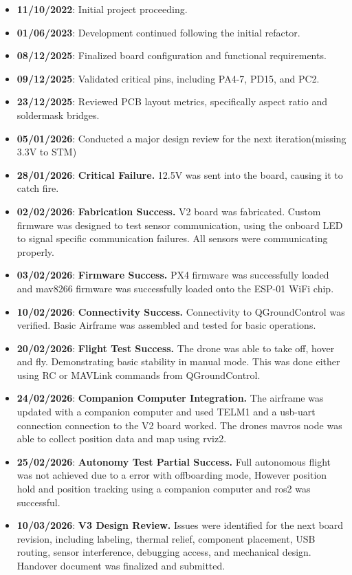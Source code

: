 \documentclass[12pt,a4paper]{article}
\begin{document}
\begin{itemize}
    \item \textbf{11/10/2022}: Initial project proceeding.
    \item \textbf{01/06/2023}: Development continued following the initial refactor.
    \item \textbf{08/12/2025}: Finalized board configuration and functional requirements.
    \item \textbf{09/12/2025}: Validated critical pins, including PA4-7, PD15, and PC2.
    \item \textbf{23/12/2025}: Reviewed PCB layout metrics, specifically aspect ratio and soldermask bridges.
    \item \textbf{05/01/2026}: Conducted a major design review for the next iteration(missing 3.3V to STM)
    \item \textbf{28/01/2026}: \textbf{Critical Failure.} 12.5V was sent into the board, causing it to catch fire.
    \item \textbf{02/02/2026}: \textbf{Fabrication Success.} V2 board was fabricated. Custom firmware was designed to test sensor communication, using the onboard LED to signal specific communication failures. All sensors were communicating properly.
    \item \textbf{03/02/2026}: \textbf{Firmware Success.} PX4 firmware was successfully loaded and mav8266 firmware was successfully loaded onto the ESP-01 WiFi chip. 
    \item \textbf{10/02/2026}: \textbf{Connectivity Success.} Connectivity to QGroundControl was verified. Basic Airframe was assembled and tested for basic operations.
    \item \textbf{20/02/2026}: \textbf{Flight Test Success.} The drone was able to take off, hover and fly. Demonstrating basic stability in manual mode. This was done either using RC or MAVLink commands from QGroundControl.
    \item \textbf{24/02/2026}: \textbf{Companion Computer Integration.} The airframe was updated with a companion computer and used TELM1 and a usb-uart connection connection to the V2 board worked. The drones mavros node was able to collect position data and map using rviz2.
    \item \textbf{25/02/2026}: \textbf{Autonomy Test Partial Success.} Full autonomous flight was not achieved due to a error with offboarding mode, However position hold and position tracking using a companion computer and ros2 was successful.
    \item \textbf{10/03/2026}: \textbf{V3 Design Review.} Issues were identified for the next board revision, including labeling, thermal relief, component placement, USB routing, sensor interference, debugging access, and mechanical design. Handover document was finalized and submitted.
\end{itemize}
\end{document}
